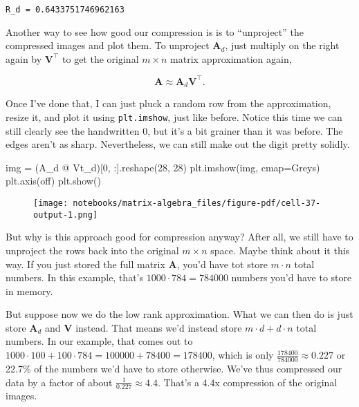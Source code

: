 \documentclass[
  letterpaper,
  DIV=11,
  numbers=noendperiod]{scrreprt}
\newenvironment{Shaded}{\begin{snugshade}}{\end{snugshade}}
\newcommand{\DecValTok}[1]{\textcolor[rgb]{0.68,0.00,0.00}{#1}}
\newcommand{\NormalTok}[1]{\textcolor[rgb]{0.00,0.23,0.31}{#1}}
\newcommand{\OperatorTok}[1]{\textcolor[rgb]{0.37,0.37,0.37}{#1}}
\newcommand{\StringTok}[1]{\textcolor[rgb]{0.13,0.47,0.30}{#1}}
\begin{document}
\begin{verbatim}
R_d = 0.6433751746962163
\end{verbatim}

Another way to see how good our compression is is to ``unproject'' the
compressed images and plot them. To unproject \(\mathbf{A}_d\), just
multiply on the right again by \(\mathbf{V}^\top\) to get the original
\(m \times n\) matrix approximation again,

\[\mathbf{A} \approx \mathbf{A}_d \mathbf{V}^\top.\]

Once I've done that, I can just pluck a random row from the
approximation, resize it, and plot it using \texttt{plt.imshow}, just
like before. Notice this time we can still clearly see the handwritten
\(0\), but it's a bit grainer than it was before. The edges aren't as
sharp. Nevertheless, we can still make out the digit pretty solidly.

\begin{Shaded}
\begin{Highlighting}[]
\NormalTok{img }\OperatorTok{=}\NormalTok{ (A\_d }\OperatorTok{@}\NormalTok{ Vt\_d)[}\DecValTok{0}\NormalTok{, :].reshape(}\DecValTok{28}\NormalTok{, }\DecValTok{28}\NormalTok{)}
\NormalTok{plt.imshow(img, cmap}\OperatorTok{=}\StringTok{\textquotesingle{}Greys\textquotesingle{}}\NormalTok{)}
\NormalTok{plt.axis(}\StringTok{\textquotesingle{}off\textquotesingle{}}\NormalTok{)}
\NormalTok{plt.show()}
\end{Highlighting}
\end{Shaded}

\begin{figure}[H]

{\centering \texttt{[image: notebooks/matrix-algebra\_files/figure-pdf/cell-37-output-1.png]}

}

\end{figure}

But why is this approach good for compression anyway? After all, we
still have to unproject the rows back into the original \(m \times n\)
space. Maybe think about it this way. If you just stored the full matrix
\(\mathbf{A}\), you'd have tot store \(m \cdot n\) total numbers. In
this example, that's \(1000 \cdot 784 = 784000\) numbers you'd have to
store in memory.

But suppose now we do the low rank approximation. What we can then do is
just store \(\mathbf{A}_d\) and \(\mathbf{V}\) instead. That means we'd
instead store \(m \cdot d + d \cdot n\) total numbers. In our example,
that comes out to
\(1000 \cdot 100 + 100 \cdot 784 = 100000 + 78400 = 178400\), which is
only \(\frac{178400}{784000} \approx 0.227\) or 22.7\% of the numbers
we'd have to store otherwise. We've thus compressed our data by a factor
of about \(\frac{1}{0.227} \approx 4.4\). That's a 4.4x compression of
the original images.
\end{document}
